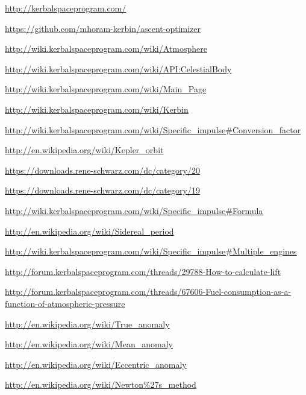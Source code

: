 \documentclass[11pt]{report}
\begin{document}
\printindex

\begin{thebibliography}{Kerbin}

  \url{http://kerbalspaceprogram.com/}

  \url{https://github.com/mhoram-kerbin/ascent-optimizer}

  \url{http://wiki.kerbalspaceprogram.com/wiki/Atmosphere}

  \url{http://wiki.kerbalspaceprogram.com/wiki/API:CelestialBody}

  \url{http://wiki.kerbalspaceprogram.com/wiki/Main_Page}

  \url{http://wiki.kerbalspaceprogram.com/wiki/Kerbin}

  \url{http://wiki.kerbalspaceprogram.com/wiki/Specific_impulse#Conversion_factor}

  \url{http://en.wikipedia.org/wiki/Kepler_orbit}

  \url{https://downloads.rene-schwarz.com/dc/category/20}

  \url{https://downloads.rene-schwarz.com/dc/category/19}

  \url{http://wiki.kerbalspaceprogram.com/wiki/Specific_impulse#Formula}

  \url{http://en.wikipedia.org/wiki/Sidereal_period}

  \url{http://wiki.kerbalspaceprogram.com/wiki/Specific_impulse#Multiple_engines}

  \url{http://forum.kerbalspaceprogram.com/threads/29788-How-to-calculate-lift}

  \url{http://forum.kerbalspaceprogram.com/threads/67606-Fuel-consumption-as-a-function-of-atmospheric-pressure}

  \url{http://en.wikipedia.org/wiki/True_anomaly}

  \url{http://en.wikipedia.org/wiki/Mean_anomaly}

  \url{http://en.wikipedia.org/wiki/Eccentric_anomaly}

  \url{http://en.wikipedia.org/wiki/Newton\%27s_method}


\end{thebibliography}
\end{document}
